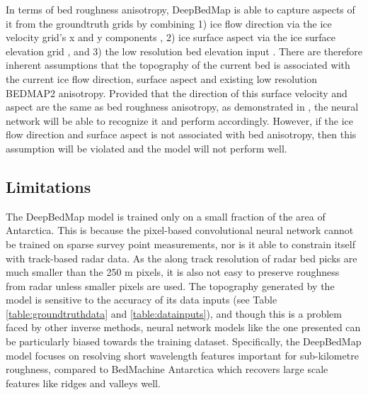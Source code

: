 \documentclass[tc, manuscript]{copernicus}
\begin{document}
In terms of bed roughness anisotropy, DeepBedMap is able to capture aspects of it from the groundtruth grids by combining 1) ice flow direction via the ice velocity grid's x and y components \citep{MouginotMEaSUREsPhaseMap2019}, 2) ice surface aspect via the ice surface elevation grid \citep{HowatReferenceElevationModel2019}, and 3) the low resolution bed elevation input \citep{FretwellBedmap2improvedice2013}.
There are therefore inherent assumptions that the topography of the current bed is associated with the current ice flow direction, surface aspect and existing low resolution BEDMAP2 anisotropy.
Provided that the direction of this surface velocity and aspect are the same as bed roughness anisotropy, as demonstrated in \citet{HolschuhLinkingpostglaciallandscapes2020}, the neural network will be able to recognize it and perform accordingly.
However, if the ice flow direction and surface aspect is not associated with bed anisotropy, then this assumption will be violated and the model will not perform well.

\subsection{Limitations}

The DeepBedMap model is trained only on a small fraction of the area of Antarctica.
This is because the pixel-based convolutional neural network cannot be trained on sparse survey point measurements, nor is it able to constrain itself with track-based radar data.
As the along track resolution of radar bed picks are much smaller than the 250 m pixels, it is also not easy to preserve roughness from radar unless smaller pixels are used.
The topography generated by the model is sensitive to the accuracy of its data inputs (see Table \ref{table:groundtruthdata} and \ref{table:datainputs}), and though this is a problem faced by other inverse methods, neural network models like the one presented can be particularly biased towards the training dataset.
Specifically, the DeepBedMap model focuses on resolving short wavelength features important for sub-kilometre roughness, compared to BedMachine Antarctica \citep{MorlighemDeepglacialtroughs2019} which recovers large scale features like ridges and valleys well.
\end{document}
